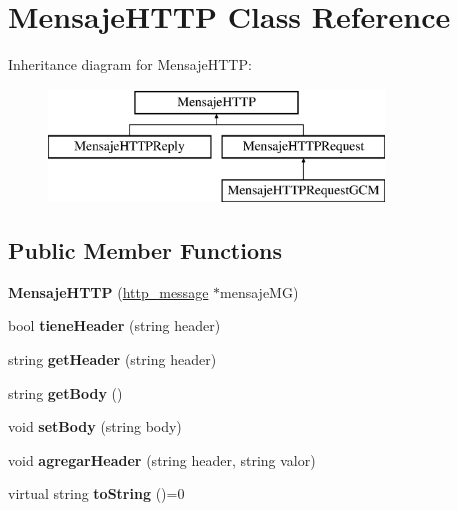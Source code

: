 \hypertarget{classMensajeHTTP}{}\section{Mensaje\+H\+T\+TP Class Reference}
\label{classMensajeHTTP}
Inheritance diagram for Mensaje\+H\+T\+TP\+:\begin{figure}[H]
\begin{center}
\leavevmode
\includegraphics[height=3.000000cm]{classMensajeHTTP}
\end{center}
\end{figure}
\subsection*{Public Member Functions}
\begin{DoxyCompactItemize}
\item 
{\bfseries Mensaje\+H\+T\+TP} (\hyperlink{structhttp__message}{http\+\_\+message} $\ast$mensaje\+MG)\hypertarget{classMensajeHTTP_a81014d5d4ff6304f73ae8ca79e6afc1d}{}\label{classMensajeHTTP_a81014d5d4ff6304f73ae8ca79e6afc1d}

\item 
bool {\bfseries tiene\+Header} (string header)\hypertarget{classMensajeHTTP_ae287891749d61472d882403a9a89d0a4}{}\label{classMensajeHTTP_ae287891749d61472d882403a9a89d0a4}

\item 
string {\bfseries get\+Header} (string header)\hypertarget{classMensajeHTTP_a2bc7778920edd7b85ded455ca16098b7}{}\label{classMensajeHTTP_a2bc7778920edd7b85ded455ca16098b7}

\item 
string {\bfseries get\+Body} ()\hypertarget{classMensajeHTTP_a3a4ae2f0872d7fd3662cc93ebfc12c65}{}\label{classMensajeHTTP_a3a4ae2f0872d7fd3662cc93ebfc12c65}

\item 
void {\bfseries set\+Body} (string body)\hypertarget{classMensajeHTTP_a0797090e1196d3d43b2f7484525d81c2}{}\label{classMensajeHTTP_a0797090e1196d3d43b2f7484525d81c2}

\item 
void {\bfseries agregar\+Header} (string header, string valor)\hypertarget{classMensajeHTTP_af1e394fc2962d285424a94bb7c290a4c}{}\label{classMensajeHTTP_af1e394fc2962d285424a94bb7c290a4c}

\item 
virtual string {\bfseries to\+String} ()=0\hypertarget{classMensajeHTTP_aa24169ae958f27977b3345cf2bb162e3}{}\label{classMensajeHTTP_aa24169ae958f27977b3345cf2bb162e3}

\end{DoxyCompactItemize}
